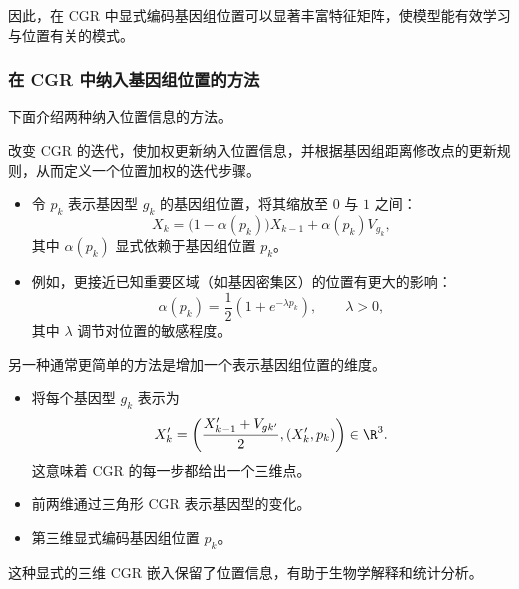 因此，在 CGR 中显式编码基因组位置可以显著丰富特征矩阵，使模型能有效学习与位置有关的模式。

\subsubsection{在 CGR 中纳入基因组位置的方法}
下面介绍两种纳入位置信息的方法。

改变 CGR 的迭代，使加权更新纳入位置信息，并根据基因组距离修改点的更新规则，从而定义一个位置加权的迭代步骤。
\begin{itemize}
  \item 令 $p_k$ 表示基因型 $g_k$ 的基因组位置，将其缩放至 $0$ 与 $1$ 之间：
  \[
    X_k=\bigl(1-\alpha(p_k)\bigr)X_{k-1}+\alpha(p_k)V_{g_k},
  \]
  其中 $\alpha(p_k)$ 显式依赖于基因组位置 $p_k$。
  \item 例如，更接近已知重要区域（如基因密集区）的位置有更大的影响：
  \[
    \alpha(p_k)=\frac12(1+e^{-\lambda p_k}),\qquad \lambda>0,
  \]
  其中 $\lambda$ 调节对位置的敏感程度。
\end{itemize}

另一种通常更简单的方法是增加一个表示基因组位置的维度。
\begin{itemize}
  \item 将每个基因型 $g_k$ 表示为
  \[
    X'_k=\left(\frac{X'_{k-1}+V_{gk'}}{2},(X'_k,p_k)\right)\in\R^3.
  \]
  这意味着 CGR 的每一步都给出一个三维点。
  \item 前两维通过三角形 CGR 表示基因型的变化。
  \item 第三维显式编码基因组位置 $p_k$。
\end{itemize}
这种显式的三维 CGR 嵌入保留了位置信息，有助于生物学解释和统计分析。
